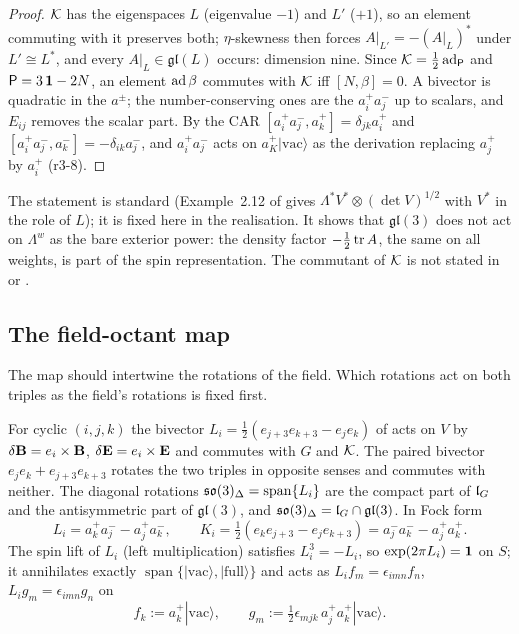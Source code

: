 \begin{proof}
$\mathcal K$ has the eigenspaces $L$ (eigenvalue $-1$) and $L'$ ($+1$), so an element commuting with it preserves both; $\eta$-skewness then
forces $A|_{L'}=-(A|_L)^*$ under $L'\cong L^*$, and every $A|_L\in\mathfrak{gl}(L)$ occurs: dimension nine. Since $\mathcal K=\tfrac12\operatorname{ad}_{\mathsf P}$ and
$\mathsf P=3\,\mathbf 1-2N$, an element $\operatorname{ad}\beta$ commutes with $\mathcal K$ iff $[N,\beta]=0$. A bivector is quadratic in the $a^\pm$; the number-conserving
ones are the $a^+_ia^-_j$ up to scalars, and $E_{ij}$ removes the scalar part. By the CAR $[a^+_ia^-_j,a^+_k]=\delta_{jk}a^+_i$ and
$[a^+_ia^-_j,a^-_k]=-\delta_{ik}a^-_j$, and $a^+_ia^-_j$ acts on $a^+_K|\mathrm{vac}\rangle$ as the derivation replacing $a^+_j$ by $a^+_i$ (r3-8).
\end{proof}

The statement is standard (Example~2.12 of \cite{Gualtieri03} gives $\Lambda^*V^*\otimes(\det V)^{1/2}$ with $V^*$ in the role of $L$); it is fixed
here in the realisation. It shows that $\mathfrak{gl}(3)$ does not act on $\Lambda^w$ as the bare exterior power: the density factor
$-\tfrac12\operatorname{tr} A$, the same on all weights, is part of the spin representation. The commutant of $\mathcal K$ is not stated in \cite{ES17} or \cite{RE}.

\subsection{The field-octant map}
\label{r3:sec:phi}

The map should intertwine the rotations of the field. Which rotations act on both triples as the field's rotations is fixed first.

\begin{lemma}
\label{r3:lem:rot}
For cyclic $(i,j,k)$ the bivector $L_i=\tfrac12(e_{j+3}e_{k+3}-e_je_k)$ of \cite{RE} acts on $V$ by $\delta\mathbf B=e_i\times\mathbf B$, $\delta\mathbf E=e_i\times\mathbf E$
and commutes with $G$ and $\mathcal K$. The paired bivector $e_je_k+e_{j+3}e_{k+3}$ rotates the two triples in opposite senses and commutes with
neither. The diagonal rotations $\mathfrak{so}(3)_\Delta=\operatorname{span}\{L_i\}$ are the compact part of $\mathfrak l_G$ and the antisymmetric part of
$\mathfrak{gl}(3)$, and $\mathfrak{so}(3)_\Delta=\mathfrak l_G\cap\mathfrak{gl}(3)$. In Fock form
\[
L_i=a^+_ka^-_j-a^+_ja^-_k,\qquad K_i=\tfrac12(e_ke_{j+3}-e_je_{k+3})=a^-_ja^-_k-a^+_ja^+_k .
\]
The spin lift of $L_i$ (left multiplication) satisfies $L_i^3=-L_i$, so $\exp(2\pi L_i)=\mathbf 1$ on $S$; it annihilates exactly
$\operatorname{span}\{|\mathrm{vac}\rangle,|\mathrm{full}\rangle\}$ and acts as $L_if_m=\epsilon_{imn}f_n$, $L_ig_m=\epsilon_{imn}g_n$ on
\[
f_k:=a^+_k|\mathrm{vac}\rangle,\qquad g_m:=\tfrac12\epsilon_{mjk}\,a^+_ja^+_k|\mathrm{vac}\rangle .
\]
\end{lemma}


